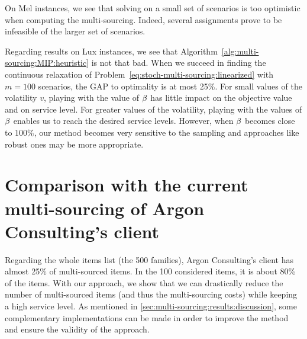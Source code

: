 On Mel instances, we see that solving on a small set of scenarios is too optimistic when computing the multi-sourcing.
Indeed, several assignments prove to be infeasible of the larger set of scenarios.


Regarding results on Lux instances, we see that Algorithm~\ref{alg:multi-sourcing:MIP:heuristic} is not that bad.
When we succeed in finding the continuous relaxation of Problem~\eqref{eq:stoch-multi-sourcing:linearized} with $m=100$ scenarios, the GAP to optimality is at most 25\%.
For small values of the volatility $v$, playing with the value of $\beta$ has little impact on the objective value and on service level.
For greater values of the volatility, playing with the values of $\beta$ enables us to reach the desired service levels.
However, when $\beta$ becomes close to $100\%$, our method becomes very sensitive to the sampling and approaches like robust ones may be more appropriate.





\section{Comparison with the current multi-sourcing of Argon Consulting's client}


Regarding the whole items list (\ie the 500 families), Argon Consulting's client has almost 25\% of multi-sourced items.
In the 100 considered items, it is about 80\% of the items.
With our approach, we show that we can drastically reduce the number of multi-sourced items (and thus the multi-sourcing costs) while keeping a high service level.
As mentioned in \cref{sec:multi-sourcing:results:discussion}, some complementary implementations can be made in order to improve the method and ensure the validity of the approach.



